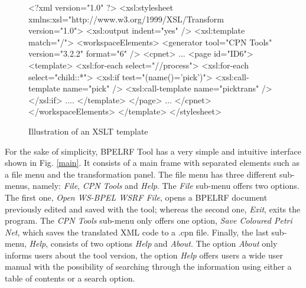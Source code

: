 \begin{figure}[!h]
\begin{center}
\scriptsize
\begin{boxedverbatim}
<?xml version="1.0" ?>
<xsl:stylesheet
 xmlns:xsl="http://www.w3.org/1999/XSL/Transform 
version="1.0">
<xsl:output indent="yes" />
<xsl:template match="/">
<workspaceElements>
<generator tool="CPN Tools" version="3.2.2" format="6" />
<cpnet>
...
<page id="ID6">
<template>
<xsl:for-each select="//process">
<xsl:for-each select="child::*">
<xsl:if test="(name()='pick')">
<xsl:call-template name="pick" />
<xsl:call-template name="picktrans" />
</xsl:if>
....
</template>
</page>
...
</cpnet>
</workspaceElements>
</template>
</stylesheet>
	
\end{boxedverbatim}
\end{center}
\vspace{-0.4cm}
\caption{Illustration of an XSLT template}\label{example1}
\end{figure}
For the sake of simplicity, BPELRF Tool has a very simple and intuitive interface
shown in Fig. \ref{main}. It consists of a main frame with separated elements such as a file menu and the transformation panel. The file menu has three different sub-menus, namely: \emph{File},  \emph{CPN Tools} and \emph{Help}. The \emph{File} sub-menu offers two options. The first one, \emph{Open WS-BPEL WSRF File}, opens a BPELRF document previously edited and saved with the tool; whereas the second one, \emph{Exit}, exits the program. The
\emph{CPN Tools} sub-menu only offers one option, \emph{Save Coloured Petri Net}, which
saves the translated XML code to a .cpn file. Finally, the last sub-menu, \emph{Help}, consists of two options \emph{Help} and \emph{About}. The option \emph{About} only informs users about the tool version, the option \emph{Help} offers users a wide user manual with the possibility of searching through the information using either a table of contents or a 
search option. 

